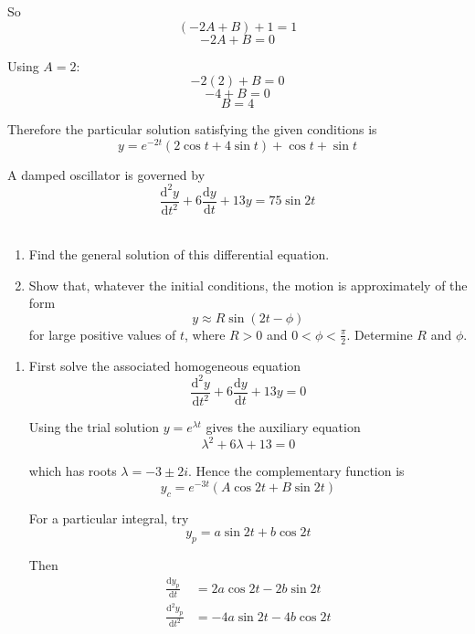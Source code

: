 \documentclass[leqno]{article}
\begin{document}
\begin{enumerate}[
  label=\textbf{\arabic*.},
  leftmargin=*,
  topsep=0pt,
  partopsep=0pt,
  parsep=0pt
]
\begin{djsSolution}
So
\[
(-2A+B)+1=1
\]
\[
-2A+B=0
\]

Using \(A=2\):
\[
-2(2)+B=0
\]
\[
-4+B=0
\]
\[
B=4
\]

Therefore the particular solution satisfying the given conditions is
\[
y=e^{-2t}(2\cos t+4\sin t)+\cos t+\sin t
\]
\end{djsSolution}


\newpage

\questionitem

A damped oscillator is governed by \\
\[
\frac{\mathrm{d}^2 y}{\mathrm{d}t^2}+6\frac{\mathrm{d}y}{\mathrm{d}t}+13y=75\sin 2t
\] \\
\begin{enumerate}[label=\textbf{(\alph*)}]
  \item Find the general solution of this differential equation.  \\
  \item Show that, whatever the initial conditions, the motion is approximately of the form
  \[
  y\approx R\sin(2t-\phi)
  \]
  for large positive values of $t$, where $R>0$ and $0<\phi<\frac{\pi}{2}$. Determine $R$ and $\phi$.  \\
\end{enumerate}

\vspace*{10pt}

\begin{djsSolution}
\begin{enumerate}[label=\textbf{(\alph*)}]
  \item First solve the associated homogeneous equation
  \[
  \frac{\mathrm{d}^2y}{\mathrm{d}t^2}+6\frac{\mathrm{d}y}{\mathrm{d}t}+13y=0
  \]

  Using the trial solution $y=e^{\lambda t}$ gives the auxiliary equation
  \[
  \lambda^2+6\lambda+13=0
  \]

  which has roots $\lambda=-3\pm 2i$. Hence the complementary function is
  \[
  y_c=e^{-3t}(A\cos 2t+B\sin 2t)
  \]

  For a particular integral, try
  \[
  y_p=a\sin 2t+b\cos 2t
  \]

  Then
  \begin{align*}
  \frac{\mathrm{d}y_p}{\mathrm{d}t}&=2a\cos 2t-2b\sin 2t \\
  \frac{\mathrm{d}^2y_p}{\mathrm{d}t^2}&=-4a\sin 2t-4b\cos 2t
  \end{align*}


\end{enumerate}
\end{djsSolution}
\end{enumerate}
\end{document}

